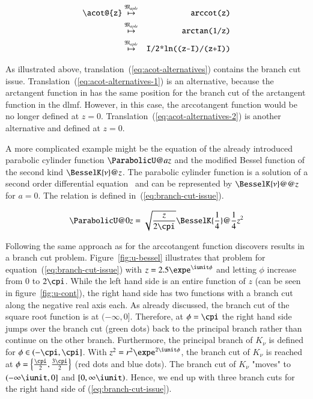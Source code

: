 \begin{eqnarray}
\verb|\acot@{z}| & \overset{\langMaple}{\mapsto} & \verb|arccot(z)|\label{eq:acot-alternatives}\\
& \overset{\langMaple}{\mapsto} & \verb|arctan(1/z)|\label{eq:acot-alternatives-1}\\
& \overset{\langMaple}{\mapsto} & \verb|I/2*ln((z-I)/(z+I))|\label{eq:acot-alternatives-2}
\end{eqnarray}

As illustrated above, translation~(\ref{eq:acot-alternatives}) contains the branch cut issue. Translation~(\ref{eq:acot-alternatives-1}) is an alternative, because the arctangent function in \Maple{} has the same position for the branch cut of the arctangent function in the \gls{dlmf}. However, in this case, the arccotangent function would be no longer defined at $z=0$. Translation~(\ref{eq:acot-alternatives-2}) is another alternative and defined at $z=0$. 

A more complicated example might be the equation of the already introduced parabolic cylinder function $\ParabolicU@{a}{z}$ and the modified Bessel function of the second kind $\BesselK{\nu}@{z}$. The parabolic cylinder function is a solution of a second order differential equation~\cite[(12.2i)]{NIST:DLMF} and can be represented by $\BesselK{\nu}@@{z}$ for $a=0$. The relation is defined in~(\ref{eq:branch-cut-issue}). 

\begin{equation}\label{eq:branch-cut-issue}
\displaystyle \ParabolicU@{0}{z} = \sqrt{\frac{z}{2\cpi}}\BesselK{\frac{1}{4}}@{\frac{1}{4}z^2}
\end{equation}

Following the same approach as for the arccotangent function discovers results in a branch cut problem. Figure~\ref{fig:u-bessel} illustrates that problem for equation~(\ref{eq:branch-cut-issue}) with $z=2.5\expe^{\iunit\phi}$ and letting $\phi$ increase from $0$ to $2\cpi$. While the left hand side is an entire function of $z$ (can be seen in figure~\ref{fig:u-cont}), the right hand side has two functions with a branch cut along the negative real axis each. As already discussed, the branch cut of the square root function is at $(-\infty,0]$. Therefore, at $\phi = \cpi$ the right hand side jumps over the branch cut (green dots) back to the principal branch rather than continue on the other branch. Furthermore, the principal branch of $K_\nu$ is defined for $\phi \in (-\cpi,\cpi]$. With $z^2 = r^2\expe^{2\iunit\phi}$, the branch cut of $K_\nu$ is reached at $\phi = \left\{ \frac{\cpi}{2}, \frac{3\cpi}{2} \right\}$ (red dots and blue dots). The branch cut of $K_\nu$ "moves" to $(-\infty\iunit,0]$ and $[0,\infty\iunit)$. Hence, we end up with three branch cuts for the right hand side of (\ref{eq:branch-cut-issue}).

